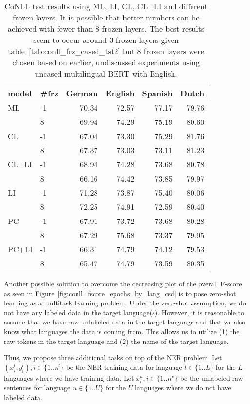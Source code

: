 \documentclass[letterpaper]{article} \usepackage{aaai20}  \usepackage{times}  \usepackage{helvet} \usepackage{courier}  \usepackage[hyphens]{url}  \usepackage{graphicx} \urlstyle{rm} \def\UrlFont{\rm}  \usepackage{graphicx}  \frenchspacing  \setlength{\pdfpagewidth}{8.5in}  \setlength{\pdfpageheight}{11in}  \usepackage{amsmath}
\begin{document}
\begin{table}
\begin{center}
\begin{tabular}{llrrrr}
\toprule
 model & \#frz &   German &   English &  Spanish & Dutch \\
\midrule
ML & -1  & 70.34 & 72.57 & 77.17 & 79.76 \\ & 8  & 69.94 & 74.29 & 75.19 & 80.60 \\      
CL & -1  & 67.04 & 73.30 & 75.29 & 81.76 \\
      &  8  & 67.37 & 73.03 & 73.11 & 81.23 \\
CL+LI & -1  & 68.94 & 74.28 & 73.68 & 80.78 \\
      &  8  & 66.16 & 74.42 & 73.85 & 79.97 \\
LI & -1  & 71.28 & 73.87 & 75.40 & 80.06 \\
      &  8  & 72.25 & 74.91 & 72.59 & 80.40 \\
PC & -1  & 67.91 & 73.72 & 73.68 & 80.28 \\
      &  8  & 67.29 & 75.68 & 73.37 & 79.95 \\
PC+LI & -1  & 66.31 & 74.79 & 74.12 & 79.53 \\
      &  8  & 65.47 & 74.79 & 73.59 & 80.35 \\
\bottomrule
\end{tabular}
\caption{CoNLL test results using ML, LI, CL, CL+LI and different
  frozen layers. It is possible that better numbers can be achieved with fewer than 8 frozen layers. The best results seem to occur around 3 frozen layers given table~\ref{tab:conll_frz_cased_tst2} but 8 frozen layers were chosen based on earlier, undiscussed experiments using uncased multilingual BERT with English.}
\label{tab:conll_exps_cased_tst2}
\end{center}
\end{table}
 
Another possible solution to overcome the decreasing plot of the overall F-score as seen in Figure~\ref{fig:conll_fscore_epochs_by_lang_csd} is to pose zero-shot learning as a multitask learning problem.
Under the zero-shot assumption, we do not have any labeled data in the target language(s). However, it is reasonable to assume that we have raw unlabeled data in the target language and that we also know what languages the data is coming from. This allows us to utilize (1) the raw tokens in the target language and (2) the name of the target language.

Thus, we propose three additional tasks on top of the NER problem.
Let $(x_i^l, y_i^l), i \in \{1..n^l\}$ be the NER training data for language $l \in \{1..L\}$ for the $L$ languages where we have training data. Let $x_i^u, i \in \{1..n^u\}$ be the unlabeled raw sentences for language $u \in \{1..U\}$ for the $U$ languages where we do not have labeled data.
\end{document}
